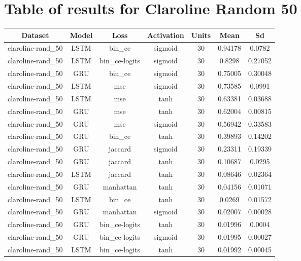 \documentclass{article}%
\begin{document}
\section{Table of results for Claroline Random 50}%
\label{sec:TableofresultsforClarolineRandom50}%
\begin{longtable}{|c|c|c|c|c|c|c|}%
\hline%
\rowcolor{lightgray!70}%
\textbf{Dataset}&\textbf{Model}&\textbf{Loss}&\textbf{Activation}&\textbf{Units}&\textbf{Mean}&\textbf{Sd}\\%
\hline%
claroline{-}rand\_50&LSTM&bin\_ce&sigmoid&30&0.94178&0.0782\\%
\hline%
claroline{-}rand\_50&LSTM&bin\_ce{-}logits&sigmoid&30&0.8298&0.27052\\%
\hline%
claroline{-}rand\_50&GRU&bin\_ce&sigmoid&30&0.75005&0.30048\\%
\hline%
claroline{-}rand\_50&LSTM&mse&sigmoid&30&0.73585&0.0991\\%
\hline%
claroline{-}rand\_50&LSTM&mse&tanh&30&0.63381&0.03688\\%
\hline%
claroline{-}rand\_50&GRU&mse&tanh&30&0.62004&0.00815\\%
\hline%
claroline{-}rand\_50&GRU&mse&sigmoid&30&0.56942&0.33583\\%
\hline%
claroline{-}rand\_50&GRU&bin\_ce&tanh&30&0.39893&0.14202\\%
\hline%
claroline{-}rand\_50&GRU&jaccard&sigmoid&30&0.23311&0.19339\\%
\hline%
claroline{-}rand\_50&GRU&jaccard&tanh&30&0.10687&0.0295\\%
\hline%
claroline{-}rand\_50&LSTM&jaccard&tanh&30&0.08646&0.02364\\%
\hline%
claroline{-}rand\_50&GRU&manhattan&tanh&30&0.04156&0.01071\\%
\hline%
claroline{-}rand\_50&LSTM&bin\_ce&tanh&30&0.0269&0.01572\\%
\hline%
claroline{-}rand\_50&GRU&manhattan&sigmoid&30&0.02007&0.00028\\%
\hline%
claroline{-}rand\_50&GRU&bin\_ce{-}logits&tanh&30&0.01996&0.0004\\%
\hline%
claroline{-}rand\_50&GRU&bin\_ce{-}logits&sigmoid&30&0.01995&0.00027\\%
\hline%
claroline{-}rand\_50&LSTM&bin\_ce{-}logits&tanh&30&0.01992&0.00045\\%
\hline%
\end{longtable}

%
\newpage%
\end{document}
